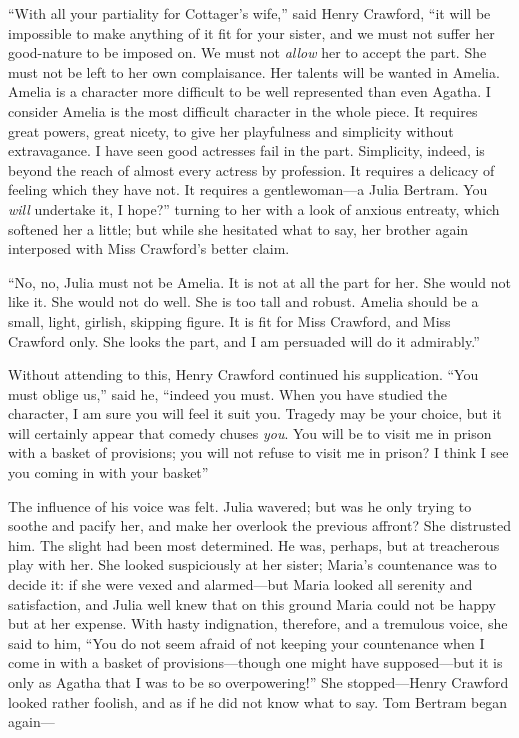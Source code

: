 ``With all your partiality for Cottager's wife,''
said Henry Crawford, ``it will be impossible to make
anything of it fit for your sister, and we must not suffer
her good-nature to be imposed on.  We must not \emph{allow}
her to accept the part.  She must not be left to her
own complaisance.  Her talents will be wanted in Amelia.
Amelia is a character more difficult to be well represented
than even Agatha.  I consider Amelia is the most difficult
character in the whole piece.  It requires great powers,
great nicety, to give her playfulness and simplicity
without extravagance.  I have seen good actresses fail
in the part.  Simplicity, indeed, is beyond the reach
of almost every actress by profession.  It requires
a delicacy of feeling which they have not.  It requires
a gentlewoman---a Julia Bertram.  You \emph{will} undertake it,
I hope?'' turning to her with a look of anxious entreaty,
which softened her a little; but while she hesitated
what to say, her brother again interposed with Miss
Crawford's better claim.

``No, no, Julia must not be Amelia.  It is not at
all the part for her.  She would not like it.
She would not do well.  She is too tall and robust.
Amelia should be a small, light, girlish, skipping figure.
It is fit for Miss Crawford, and Miss Crawford only.
She looks the part, and I am persuaded will do it admirably.''

Without attending to this, Henry Crawford continued
his supplication.  ``You must oblige us,'' said he,
``indeed you must.  When you have studied the character, I am
sure you will feel it suit you.  Tragedy may be your choice,
but it will certainly appear that comedy chuses \emph{you}.
You will be to visit me in prison with a basket of provisions;
you will not refuse to visit me in prison?  I think I
see you coming in with your basket''

The influence of his voice was felt.  Julia wavered;
but was he only trying to soothe and pacify her, and make
her overlook the previous affront?  She distrusted him.
The slight had been most determined.  He was, perhaps,
but at treacherous play with her.  She looked suspiciously
at her sister; Maria's countenance was to decide it:
if she were vexed and alarmed---but Maria looked all
serenity and satisfaction, and Julia well knew that on
this ground Maria could not be happy but at her expense.
With hasty indignation, therefore, and a tremulous voice,
she said to him, ``You do not seem afraid of not
keeping your countenance when I come in with a basket
of provisions---though one might have supposed---but it
is only as Agatha that I was to be so overpowering!''
She stopped---Henry Crawford looked rather foolish,
and as if he did not know what to say.  Tom Bertram
began again---%

